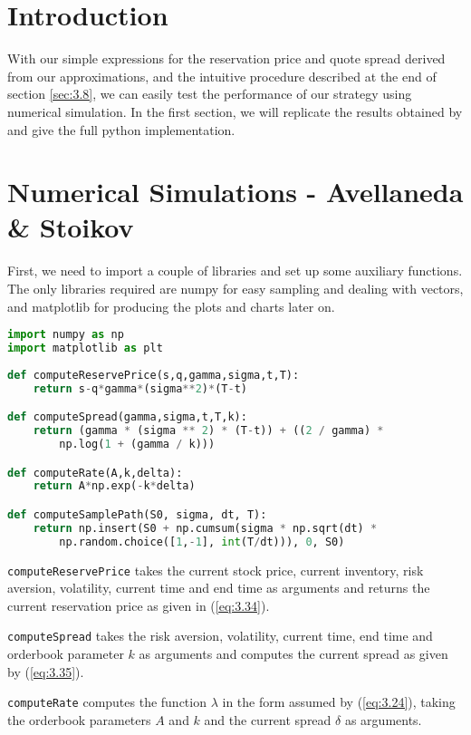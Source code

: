 \section{Introduction}

With our simple expressions for the reservation price and quote
spread derived from our approximations, and the intuitive procedure
described at the end of section \ref{sec:3.8}, we can easily test 
the performance of our strategy using numerical simulation. In the
first section, we will replicate the results obtained by \cite{AS2008}
and give the full python implementation.

\section{Numerical Simulations - Avellaneda \& Stoikov}

First, we need to import a couple of libraries and set up some 
auxiliary functions. The only libraries required are numpy for 
easy sampling and dealing with vectors, and matplotlib for 
producing the plots and charts later on. 

\begin{lstlisting}[language=Python, caption=Auxiliary Functions]
import numpy as np
import matplotlib as plt
        
def computeReservePrice(s,q,gamma,sigma,t,T):
    return s-q*gamma*(sigma**2)*(T-t)

def computeSpread(gamma,sigma,t,T,k):
    return (gamma * (sigma ** 2) * (T-t)) + ((2 / gamma) * 
        np.log(1 + (gamma / k)))

def computeRate(A,k,delta):
    return A*np.exp(-k*delta)

def computeSamplePath(S0, sigma, dt, T):
    return np.insert(S0 + np.cumsum(sigma * np.sqrt(dt) * 
        np.random.choice([1,-1], int(T/dt))), 0, S0)
\end{lstlisting}

\texttt{computeReservePrice} takes the current stock price, current
inventory, risk aversion, volatility, current time and end time as
arguments and returns the current reservation price as given in 
(\ref{eq:3.34}).

\texttt{computeSpread} takes the risk aversion, volatility, current
time, end time and orderbook parameter $k$ as arguments and computes
the current spread as given by (\ref{eq:3.35}).

\texttt{computeRate} computes the function $\lambda$ in the form assumed
by (\ref{eq:3.24}), taking the orderbook parameters $A$ and $k$ and the 
current spread $\delta$ as arguments.

